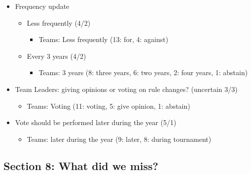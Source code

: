 \documentclass{article}
\begin{document}
\begin{itemize} 
   \item Frequency update
   \begin{itemize} 
       \item Less frequently (4/2)
       \begin{itemize} 
           \item Teams: Less frequently (13: for, 4: against)
   \end{itemize}
       \item Every 3 years (4/2)
       \begin{itemize} 
           \item Teams: 3 years (8: three years, 6: two years, 2: four years, 1: abstain)
\end{itemize}
\end{itemize}
   \item Team Leaders: giving opinions or voting on rule changes? (uncertain 3/3)
   \begin{itemize} 
       \item Teams: Voting (11: voting, 5: give opinion, 1: abstain)
\end{itemize}
   \item Vote should be performed later during the year (5/1)
   \begin{itemize} 
       \item Teams: later during the year (9: later, 8: during tournament)
   \end{itemize}

\end{itemize}
\subsection{Section 8: What did we miss?}
\end{document}
